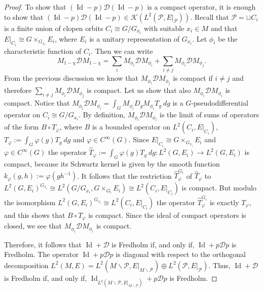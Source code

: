 \documentclass[11pt,a4paper]{amsart}
\newcommand{\maD}{\mathcal D}
\newcommand{\maK}{\mathcal K}
\newcommand{\maP}{\mathcal P}
\newcommand\<{\langle}
\renewcommand\>{\rangle}
\newcommand{\oid}{\operatorname{Id}}
\theoremstyle{definition}
\begin{document}
\begin{proof}
To show that $(\oid-p)\maD (\oid-p) $ is a compact operator, it is enough to show that 
$(\oid-p) \maD (\oid-p)\in \maK(L^2(\maP,E\vert_\maP))$. 
Recall that $\maP=\sqcup C_i$ is a finite union of clopen orbits $C_i \cong G/G_{x_i}$ with suitable $x_i\in M$ 
and that $E\vert_{C_i} \cong G \times_{G_{x_i}} E_{i}$,
where $E_{i}$ is a unitary representation of $G_{x_i}$.    
Let $\phi_i$ be the characteristic function of $C_i$. Then we can write
\begin{equation*}
M_{1-\chi} \maD M_{1-\chi} = \sum_i M_{\phi_i} \maD M_{\phi_i} + \sum_{i\neq j} M_{\phi_i} \maD M_{\phi_j}.
\end{equation*} 
From the previous discussion we know that $M_{\phi_i} \maD M_{\phi_j}$ is compact if $i \neq j$ 
and therefore $\sum_{i\neq j} M_{\phi_i} \maD M_{\phi_j}$ is compact.
Let us show that also $M_{\phi_i} \maD M_{\phi_i} $ is compact.
Notice that $M_{\phi_i} \maD M_{\phi_i} = \int_G M_{\phi_i} D_g M_{\phi_i} T_g \ dg$ is a $G$-pseudodifferential operator
on $C_i \cong G/G_{x_i}$. By definition, $M_{\phi_i} \maD M_{\phi_i}$ is the limit of sums of operators of the form 
$B \circ T_\varphi$, where $B$  is a bounded operator on $L^2(C_i,E\vert_{C_i})$, 
$T_\varphi:=\int_G \varphi(g) T_g \ dg$ and $\varphi \in C^\infty(G)$.
Since %
$E\vert_{C_i} \cong G \times_{G_{x_i}} E_{i}$ %
and $\varphi \in C^\infty(G)$  the operator 
$ \hat{T}_\varphi:=\int_G \varphi(g) T_g \ dg : L^2(G,E_{i}) \rightarrow L^2(G,E_{i})$ is compact, 
because its Schwartz kernel is given by the smooth function $k_\varphi(g,h):=\varphi(gh^{-1})$. 
It follows that the restriction $\hat{T}_\varphi^{G_{i}}$ of $\hat{T}_\varphi$ to 
$L^2(G,E_{i})^{G_{x_i}}\cong L^2(G/G_{x_i},G \times_{G_{i}} E_{i})\cong L^2(C_i,E\vert_{C_i})$ is compact.
But modulo the isomorphism $L^2(G,E_{i})^{G_{x_i}} \cong L^2(C_i,E\vert_{C_i})$ the operator $\hat{T}_\varphi^{G_{i}}$ is exactly $T_\varphi$,
and this shows that $B \circ T_\varphi$ is compact.
Since the ideal of compact operators is closed, we see that $M_{\phi_i} \maD M_{\phi_i}$ is compact.

Therefore, it follows that $\oid + \maD$ is Fredholm if, and only if, 
$\oid + p \maD p$ is Fredholm.
The operator $\oid + p \maD p$ is diagonal with respect to the orthogonal decomposition 
$L^2(M,E) =L^2(M\smallsetminus \maP , E\vert_{M\smallsetminus \maP}) \oplus L^2(\maP,E\vert_\maP)$.
Thus, $\oid + \maD$ is Fredholm if, and only if, 
$\oid_{L^2(M\smallsetminus \maP,E\vert_{M\smallsetminus \maP})} + p \maD p$ is Fredholm.


\end{proof}
\end{document}
